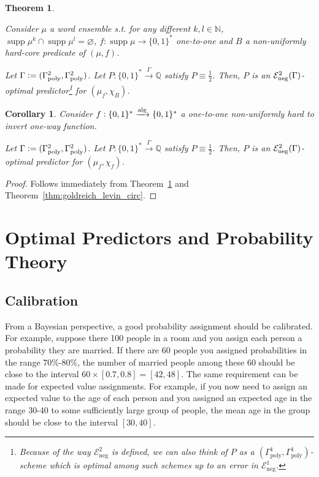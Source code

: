 \documentclass{article}
\numberwithin{equation}{section}
\theoremstyle{definition}
\theoremstyle{plain}
\newtheorem{theorem}{Theorem}[section]
\newtheorem{corollary}{Corollary}[section]
\newcommand{\Bool}{\{0,1\}}
\newcommand{\Words}{{\Bool^*}}
\DeclareMathOperator{\Supp}{supp}
\newcommand{\Nats}{\mathbb{N}}
\newcommand{\Rats}{\mathbb{Q}}
\newcommand{\Fall}{\mathcal{E}}
\newcommand{\Alg}{\xrightarrow{\textnormal{alg}}}
\newcommand{\Scheme}{\xrightarrow{\Gamma}}
\begin{document}
\begin{theorem}
\label{thm:hard_core_circ}

Consider $\mu$ a word ensemble s.t. for any different $k,l \in \Nats$, $\Supp \mu^k \cap \Supp \mu^l = \varnothing$, $f: \Supp \mu \rightarrow \Words$ one-to-one and $B$ a non-uniformly hard-core predicate of $(\mu,f)$. 

Let $\Gamma:=(\Gamma_{\textnormal{poly}}^2,\Gamma_{\textnormal{poly}}^2)$. Let $P: \Words \Scheme \Rats$ satisfy $P \equiv \frac{1}{2}$. Then, $P$ is an $\Fall_{\textnormal{neg}}^2(\Gamma)$-optimal predictor\footnote{Because of the way $\Fall_{\text{neg}}^2$ is defined, we can also think of $P$ as a $(\Gamma_{\text{poly}}^1,\Gamma_{\text{poly}}^1)$-scheme which is optimal among such schemes up to an error in $\Fall_{\text{neg}}^1$.} for $(\mu_f, \chi_B)$.

\end{theorem}

\begin{corollary}

Consider $f: \Words \Alg \Words$ a one-to-one non-uniformly hard to invert one-way function.

Let $\Gamma:=(\Gamma_{\textnormal{poly}}^2,\Gamma_{\textnormal{poly}}^2)$. Let $P: \Words \Scheme \Rats$ satisfy $P \equiv \frac{1}{2}$. Then, $P$ is an $\Fall_{\textnormal{neg}}^2(\Gamma)$-optimal predictor for $(\mu_f, \chi_f)$.

\end{corollary}

\begin{proof}

Follows immediately from Theorem~\ref{thm:hard_core_circ} and Theorem~\ref{thm:goldreich_levin_circ}.

\end{proof}

\section{Optimal Predictors and Probability Theory}
\label{sec:probability}

\subsection{Calibration}

From a Bayesian perspective, a good probability assignment should be calibrated. For example, suppose there 100 people in a room and you assign each person a probability they are married. If there are 60 people you assigned probabilities in the range 70\%-80\%, the number of married people among these 60 should be close to the interval $60 \times [0.7, 0.8] = [42,48]$. The same requirement can be made for expected value assignments. For example, if you now need to assign an expected value to the age of each person and you assigned an expected age in the range 30-40 to some sufficiently large group of people, the mean age in the group should be close to the interval $[30,40]$. 
\end{document}

